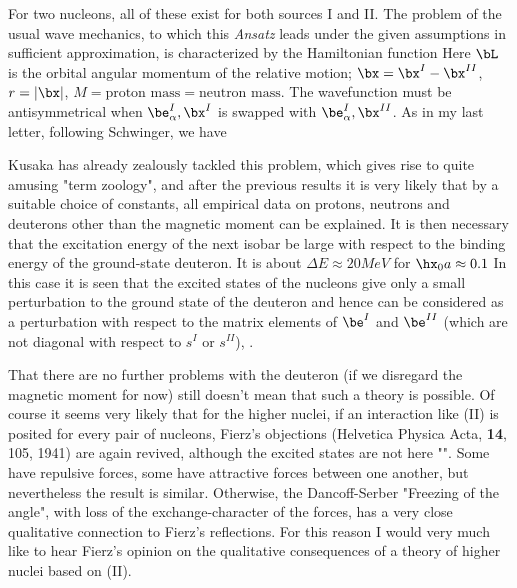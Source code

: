 For two nucleons, all of these exist for both sources I and II. The problem of the usual wave mechanics, to which this \textit{Ansatz} leads under the given assumptions in sufficient approximation, is characterized by the Hamiltonian function
Here $\bL$ is the orbital angular momentum of the relative motion; $\bx = \bx^I - \bx^{II}$, $r = |\bx|$, $M = \text{proton mass} = \text{neutron mass}$.
The wavefunction must be antisymmetrical when $\be_\alpha^I,\bx^I$ is swapped with $\be_\alpha^I,\bx^{II}$. As in my last letter, following Schwinger, we have

Kusaka has already zealously tackled this problem, which gives rise to quite amusing "term zoology", and after the previous results it is very likely that by a suitable choice of constants, all empirical data on protons, neutrons and deuterons other than the magnetic moment can be explained. It is then necessary that the excitation energy of the next isobar be large with respect to the binding energy of the ground-state deuteron. It is about $\Delta E \approx 20 MeV$ for $\hx_0 a \approx 0.1$ In this case it is seen that the excited states of the nucleons give only a small perturbation to the ground state of the deuteron and hence can be considered as a perturbation with respect to the matrix elements of $\be^I$ and $\be^{II}$ (which are not diagonal with respect to $s^I$ or $s^{II}$), .

That there are no further problems with the deuteron (if we disregard the magnetic moment for now) still doesn't mean that such a theory is possible. Of course it seems very likely that for the higher nuclei, if an interaction like (II) is posited for every pair of nucleons, Fierz's objections (Helvetica Physica Acta, \textbf{14}, 105, 1941) are again revived, although the excited states are not here "". Some have repulsive forces, some have attractive forces between one another, but nevertheless the result is similar. Otherwise, the Dancoff-Serber "Freezing of the angle", with loss of the exchange-character of the forces, has a very close qualitative connection to Fierz's reflections. For this reason I would very much like to hear Fierz's opinion on the qualitative consequences of a theory of higher nuclei based on (II).

